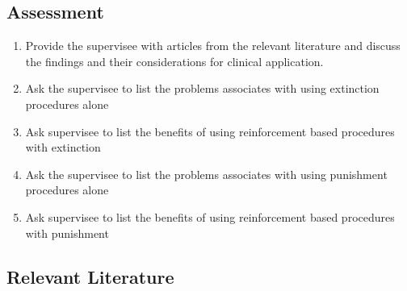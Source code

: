 \subsection{Assessment}
\begin{enumerate}
\item Provide the supervisee with articles from the relevant literature and discuss the findings and their considerations for clinical application. 
\item Ask the supervisee to list the problems associates with using extinction procedures alone 
\item Ask supervisee to list the benefits of using reinforcement based procedures with extinction
\item Ask the supervisee to list the problems associates with using punishment procedures alone
\item Ask supervisee to list the benefits of using reinforcement based procedures with punishment
\end{enumerate}
%
\subsection{Relevant Literature}
\begin{refsection}
\nocite{test,alang2017police,clayton2018black}
\printbibliography[heading=none]
\end{refsection}
